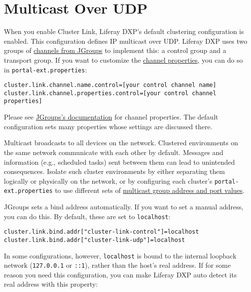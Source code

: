 \section{Multicast Over UDP}\label{multicast-over-udp}

When you enable Cluster Link, Liferay DXP's default clustering
configuration is enabled. This configuration defines IP multicast over
UDP. Liferay DXP uses two groups of
\href{http://www.jgroups.org/manual4/index.html\#_channel}{channels from
JGroups} to implement this: a control group and a transport group. If
you want to customize the
\href{@platform-ref@/7.2-latest/propertiesdoc/portal.properties.html\#Cluster\%20Link}{channel
properties}, you can do so in \texttt{portal-ext.properties}:

\begin{verbatim}
cluster.link.channel.name.control=[your control channel name]
cluster.link.channel.properties.control=[your control channel properties]
\end{verbatim}

Please see
\href{http://www.jgroups.org/manual4/index.html\#protlist}{JGroups's
documentation} for channel properties. The default configuration sets
many properties whose settings are discussed there.

Multicast broadcasts to all devices on the network. Clustered
environments on the same network communicate with each other by default.
Messages and information (e.g., scheduled tasks) sent between them can
lead to unintended consequences. Isolate such cluster environments by
either separating them logically or physically on the network, or by
configuring each cluster's \texttt{portal-ext.properties} to use
different sets of
\href{@platform-ref@/7.2-latest/propertiesdoc/portal.properties.html\#Multicast}{multicast
group address and port values}.

JGroups sets a bind address automatically. If you want to set a manual
address, you can do this. By default, these are set to
\texttt{localhost}:

\begin{verbatim}
cluster.link.bind.addr["cluster-link-control"]=localhost
cluster.link.bind.addr["cluster-link-udp"]=localhost
\end{verbatim}

In some configurations, however, \texttt{localhost} is bound to the
internal loopback network (\texttt{127.0.0.1} or \texttt{::1}), rather
than the host's real address. If for some reason you need this
configuration, you can make Liferay DXP auto detect its real address
with this property:

